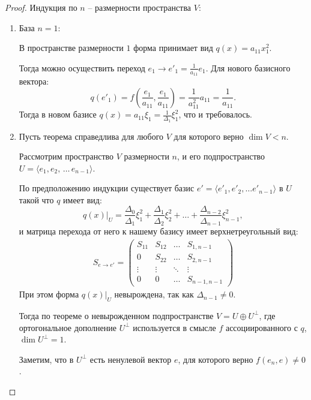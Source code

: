 \begin{proof}
    Индукция по $n$ -- размерности пространства $V$:
    \begin{enumerate}
        \item База $n = 1$:  
        
        В пространстве размерности $1$ форма принимает вид $q(x) = a_{11} x_1^2$. 

        Тогда можно осуществить переход $e_1 \to e'_1 = \frac{1}{a_{11}} e_1$. Для нового базисного вектора: 
        $$q(e'_1) = f(\frac{e_1}{a_{11}}, \frac{e_1}{a_{11}}) = \frac{1}{a_{11}^2} a_{11} = \frac{1}{a_{11}}.$$
        Тогда в новом базисе $q(x) = a_{11} \xi_1 = \frac{1}{\Delta_1} \xi_1^2$, что и требовалось.

        \item Пусть теорема справедлива для любого $V$ для которого верно $\dim V < n$. 
        
        Рассмотрим пространство $V$ размерности $n$, 
        и его подпространство $U = \langle e_1, e_2, \, \dots \,e_{n-1} \rangle$. 

        По предположению индукции существует базис $e' = \langle e'_1, e'_2, \dots e'_{n-1} \rangle$ в $U$
        такой что $q$ имеет вид:
        $$q(x)\vert_U = \frac{\Delta_0}{\Delta_1} \xi_1^2 + \frac{\Delta_1}{\Delta_2} \xi_2^2 + \dots + 
        \frac{\Delta_{n-2}}{\Delta_{n-1}} \xi_{n-1}^2,$$ и матрица перехода от него к нашему базису 
        имеет верхнетреугольный вид:
        \begin{gather*}
            S_{e \to e'} = \begin{pmatrix}
            S_{11} & S_{12} & \dots  & S_{1, n-1} \\
            0      & S_{22} & \dots  & S_{2, n-1} \\
            \vdots & \vdots & \ddots & \vdots     \\
            0      & 0      & \dots  & S_{n-1, n-1}
            \end{pmatrix}
        \end{gather*}
        При этом форма $q(x)\vert_{U}$ невырождена, так как $\Delta_{n-1} \neq 0$. 

        Тогда по теореме о невырожденном подпространстве $V = U \oplus U^{\perp}$, 
        где ортогональное дополнение $U^{\perp}$ используется в смысле $f$ ассоциированного с $q$, 
        $\dim U^{\perp} = 1$. 
        
        Заметим, что в $U^{\perp}$ есть ненулевой вектор $e$, для которого верно $f(e_n, e) \neq 0$. 
        

\end{enumerate}
\end{proof}
